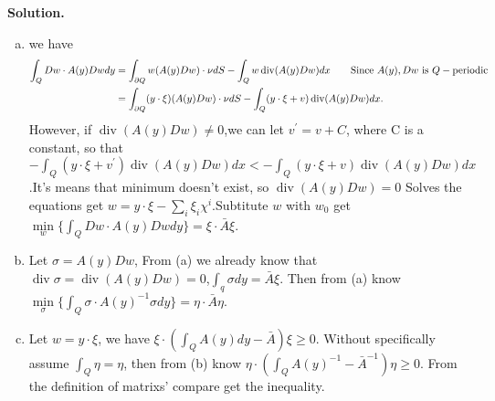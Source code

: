 \documentclass[a4paper]{book}
\newenvironment{solution}%
{\noindent\textbf{Solution.}}%
{\qedhere}
\numberwithin{equation}{chapter}
\theoremstyle{definition}
\begin{document}
\begin{solution}
  \begin{enumerate}[(a)]
  \item we have
    \begin{align*}
      \int_Q Dw \cdot A(y) Dw dy &= \int_{\partial Q} w(A(y) Dw) \cdot \nu dS - \int_Q w \operatorname{div} (A(y)Dw) dx \qquad \textmd{Since }A(y),Dw \textmd{ is } Q-\textmd{periodic} \\
                                 &=  \int_{\partial Q} (y \cdot \xi) (A(y) Dw) \cdot \nu dS - \int_Q (y \cdot \xi + v) \operatorname{div} (A(y)Dw) dx .
    \end{align*}
    However, if $\operatorname{div} (A(y)Dw) \not= 0$,we can let $v^\prime = v + C$, where C is a constant, so that $ - \int_Q (y \cdot \xi + v^\prime) \operatorname{div} (A(y)Dw) dx  <  - \int_Q (y \cdot \xi + v) \operatorname{div} (A(y)Dw) dx $.It's means that minimum doesn't exist, so $\operatorname{div} (A(y)Dw) = 0$
    Solves the equations get $w = y \cdot \xi - \sum_{i}\xi_i \chi^i$.Subtitute $w$ with $w_0$ get $\min\limits_w \{ \int_Q Dw \cdot A(y) Dw dy\} = \xi \cdot \bar{A} \xi $.

  \item Let $\sigma = A(y)Dw$, From (a) we already know that $\operatorname{div} \sigma =  \operatorname{div} (A(y)Dw) = 0$,$\int_q \sigma dy = \bar{A}\xi$. %
    Then from (a) know  $ \min\limits_{\sigma}\{\int _{Q} \sigma \cdot A(y)^{-1} \sigma dy \} = \eta \cdot \bar{A} \eta$.

    \item Let $w = y \cdot \xi$, we have $\xi \cdot (\int_Q A(y) dy - \bar{A}) \xi \geq 0$. Without specifically assume $\int_Q \eta = \eta$, then from (b) know $\eta \cdot ( \int_Q A(y)^{-1} - \bar{A}^{-1}) \eta \geq 0$. From the definition of matrixs' compare get the inequality. 
  \end{enumerate}
\end{solution}







%   

%   

%   


\end{document}
